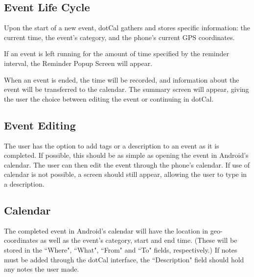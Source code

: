 \documentclass[11pt]{article}
\begin{document}
\subsection{Event Life Cycle}

Upon the start of a new event, dotCal gathers and stores specific information: the current time, the event's category, and the phone's current GPS coordinates.

If an event is left running for the amount of time specified by the reminder interval, the Reminder Popup Screen will appear.

When an event is ended, the time will be recorded, and information about the event will be transferred to the calendar. The summary screen will appear, giving the user the choice between editing the event or continuing in dotCal.


\subsection{Event Editing}

The user has the option to add tags or a description to an event as it is completed. If possible, this should be as simple as opening the event in Android's calendar. The user can then edit the event through the phone's calendar. If use of calendar is not possible, a screen should still appear, allowing the user to type in a description.

\subsection{Calendar}
The completed event in Android's calendar will have the location in geo-coordinates as well as the event's category, start and end time. (These will be stored in the ``Where", ``What", ``From" and ``To" fields, respectively.) If notes must be added through the dotCal interface, the ``Description" field should hold any notes the user made.
\end{document}
